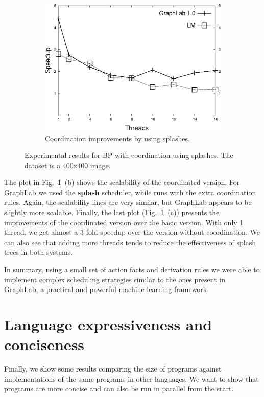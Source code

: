 \begin{figure}[ht]
\begin{subfigure}[b]{0.3\textwidth}
      \includegraphics[width=\textwidth]{new-benchmarks/improv_bp-graphlab-400.pdf}
      \caption{Coordination improvements by using splashes.}
   \end{subfigure}
   \caption{Experimental results for BP with coordination using splashes. The dataset is a 400x400 image.}
   \label{exp:splashbp}
\end{figure}

The plot in Fig.~\ref{exp:splashbp}~(b) shows the scalability of the coordinated version. For GraphLab we used the \textbf{splash} scheduler, while \lang
runs with the extra coordination rules. Again, the scalability lines are very similar, but GraphLab appears to be slightly more scalable.
Finally, the last plot (Fig.~\ref{exp:splashbp}~(c)) presents the improvements of the coordinated version over the basic version.
With only 1 thread, we get almost a 3-fold speedup over the version without coordination. We can also see that adding more threads tends to reduce the effectiveness of splash trees in both systems.

In summary, using a small set of action facts and derivation rules we were able to implement complex
scheduling strategies similar to the ones present in GraphLab, a practical and powerful machine learning
framework.

\section{Language expressiveness and conciseness}

Finally, we show some results comparing the size of \lang programs against implementations of the same
programs in other languages. We want to show that \lang programs are more concise and can also be run in parallel from the start.

